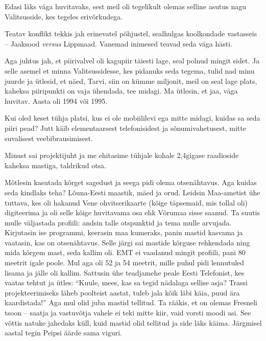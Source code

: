 Edasi läks väga huvitavaks, sest meil oli tegelikult olemas selline asutus nagu 
Valitsusside, kes tegeles erivõrkudega.


Teatav konflikt tekkis jah erinevatel põhjustel, sealhulgas 
koolkondade vastasseis -- Jaaksood \emph{versus} Lippmaad. Vanemad inimesed 
teavad seda väga hästi.

Aga juhtus jah, et piirivalvel oli kagupiir täiesti lage, 
seal polnud mingit sidet. Ja selle asemel et minna 
Valitsussidesse, kes pidanuks seda tegema, tulid nad minu juurde ja ütlesid, 
et näed, Tarvi, siin on kümme miljonit, meil on seal lage 
plats, kaheksa piiripunkti on vaja ühendada, tee midagi. Ma ütlesin, et jaa, väga huvitav. Aasta oli 1994 või 1995.


Kui oled keset tühja platsi, kus ei ole 
mobiililevi ega mitte midagi, kuidas sa seda piiri pead? Jutt käib elementaarsest telefonisidest ja sõnumivahetusest, mitte suvalisest veebibrausimisest.

Minust sai projektijuht ja me ehitasime tühjale kohale 2,4gigase raadioside
kaheksa mastiga, taldrikud otsa.


Mõtlesin kasutada 
kõrget sagedust ja seega pidi olema otsenähtavus. Aga kuidas seda 
kindlaks teha? Lõuna-Eesti maastik, mäed ja orud. Leidsin 
Maa-ametist ühe tuttava, kes oli hakanud 
Vene ohvitserikaarte (kõige täpsemaid, mis tollal oli) digiteerima ja oli 
selle kõige huvitavama osa ehk Võrumaa sisse saanud. Ta suutis mulle 
väljastada profiili: andsin talle otspunktid ja tema mulle arvujada. Kirjutasin ise programmi, keerasin maa kumeraks, panin mastid kasvama ja 
vaatasin, kas on otsenähtavus. Selle järgi sai mastide kõrguse 
rehkendada ning mida kõrgem mast, seda kallim oli. 
EMT ei 
vaadanud mingit profiili, pani 80 meetrit igale poole. Mul aga oli 
52 ja 54 meetrit, mille puhul pidi 
lennutuled lisama ja jälle oli kallim. Sattusin ühe teadjamehe peale 
Eesti Telefonist, kes vaatas tehtut ja ütles: 
\enquote{Kuule, mees, kas sa tegid nädalaga sellise asja? Trassi projekteerimiseks 
läheb poolteist aastat, tuleb jala kõik läbi käia, puud ära kaardistada!} Aga 
mul olid juba mastid tellitud. Ta rääkis, et on olemas Fresneli tsoon -- 
saatja ja vastuvõtja vahele ei teki mitte kiir, vaid vorsti moodi 
asi. See võttis natuke jahedaks 
küll, kuid mastid olid tellitud ja side läks käima. Järgmisel aastal tegin Peipsi 
äärde sama viguri. 

